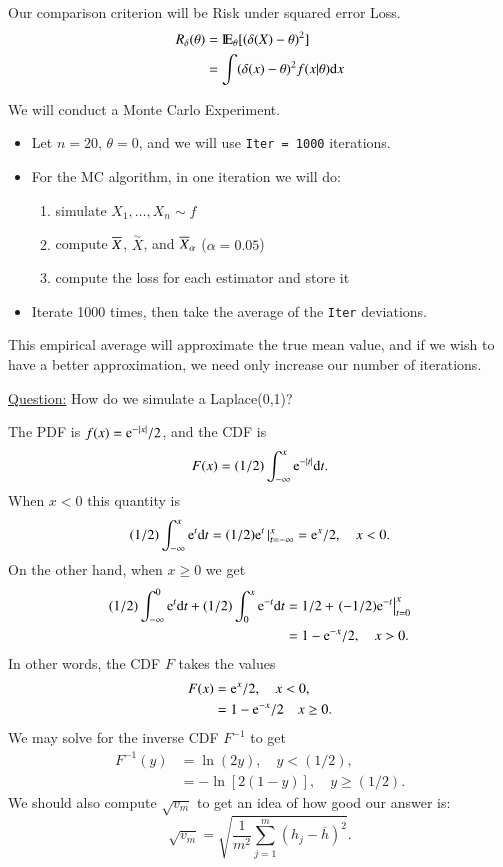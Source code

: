 \documentclass[captions=tableheading]{scrbook}
\begin{document}
Our comparison criterion will be Risk under squared error Loss. 
\begin{align*}
R_{\delta}(\theta) & =\mathrm{I\hspace{-1.5pt}E}_{\theta}[(\delta(X)-\theta)^{2}]\\
 & =\int(\delta(x)-\theta)^{2}f(x|\theta)\mathrm{d} x
\end{align*}

We will conduct a Monte Carlo Experiment.


\begin{itemize}
\item Let $n=20$, $\theta=0$, and we will use \texttt{Iter = 1000} iterations.
\item For the MC algorithm, in one iteration we will do:
\begin{enumerate}
\item simulate \(X_{1},\ldots,X_{n}\sim f\)
\item compute $\overline{X}$, $\overset{\sim}{X}$, and $\overline{X}_{\alpha}$ ($\alpha=0.05$)
\item compute the loss for each estimator and store it
\end{enumerate}
\item Iterate 1000 times, then take the average of the \texttt{Iter} deviations.
\end{itemize}

This empirical average will approximate the true mean value, and if we wish to have a better approximation, we need only increase our number of iterations.

\underline{Question:} How do we simulate a Laplace(0,1)?

The PDF is $f(x) = \mathrm{e}^{-|x|}/2$, and the CDF is 
\[
F(x)=(1/2)\int_{-\infty}^{x} \mathrm{e}^{-|t|}\mathrm{d} t.
\]
When $x < 0$ this quantity is 
\[
(1/2)\int_{-\infty}^{x}\mathrm{e}^{t}\mathrm{d} t=(1/2)\mathrm{e}^{t}\,|_{t=-\infty}^{x} = \mathrm{e}^{x}/2,\quad x < 0.\]
On the other hand, when $x \geq 0$ we get 
\begin{align*}
(1/2)\int_{-\infty}^{0}\mathrm{e}^{t}\mathrm{d} t+(1/2)\int_{0}^{x}\mathrm{e}^{-t}\mathrm{d} t & =1/2+\left.(-1/2)\mathrm{e}^{-t}\right|_{t=0}^{x}\\
 & =1-\mathrm{e}^{-x}/2,\quad x>0.
\end{align*}
 In other words, the CDF $F$ takes the values 
\begin{align*}
F(x) & =\mathrm{e}^{x}/2,\quad x < 0,\\
 & =1 - \mathrm{e}^{-x}/2\quad x \geq 0.
\end{align*}
 We may solve for the inverse CDF $F^{-1}$ to get 
\begin{align*}
F^{-1}(y) & =\ln(2y),\quad y < (1/2),\\
 & =-\ln[2(1-y)],\quad y\geq (1/2).
\end{align*}
 We should also compute $\sqrt{v_{m}}$ to get an idea of how good
our answer is: 
\[
\sqrt{v_{m}}=\sqrt{\frac{1}{m^{2}}\sum_{j=1}^{m}(h_{j}-\overline{h})^{2}}.
\]
\end{document}

